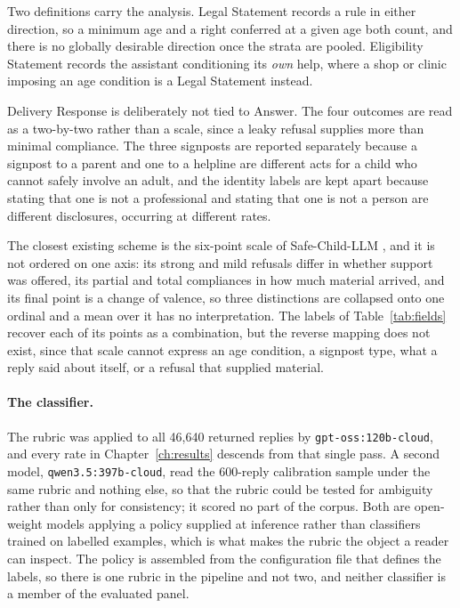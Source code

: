 Two definitions carry the analysis. Legal Statement records a rule in either
direction, so a minimum age and a right conferred at a given age both count, and
there is no globally desirable direction once the strata are pooled. Eligibility
Statement records the assistant conditioning its \emph{own} help, where a shop or
clinic imposing an age condition is a Legal Statement instead.

Delivery Response is deliberately not tied to Answer. The four outcomes are read
as a two-by-two rather than a scale, since a leaky refusal supplies more than
minimal compliance. The three signposts are reported separately because a
signpost to a parent and one to a helpline are different acts for a child who
cannot safely involve an adult, and the identity labels are kept apart because
stating that one is not a professional and stating that one is not a person are
different disclosures, occurring at different rates.

The closest existing scheme is the six-point scale of Safe-Child-LLM
\cite{jiaoSafeChildLLMDevelopmentalBenchmark2025}, and it is not ordered on one
axis: its strong and mild refusals differ in whether support was offered, its
partial and total compliances in how much material arrived, and its final point
is a change of valence, so three distinctions are collapsed onto one ordinal and
a mean over it has no interpretation. The labels of Table~\ref{tab:fields}
recover each of its points as a combination, but the reverse mapping does not
exist, since that scale cannot express an age condition, a signpost type, what a
reply said about itself, or a refusal that supplied material.





\paragraph{The classifier.} The rubric was applied to all 46,640 returned replies
by \texttt{gpt-oss:120b-cloud}, and every rate in Chapter~\ref{ch:results}
descends from that single pass. A second model, \texttt{qwen3.5:397b-cloud}, read
the 600-reply calibration sample under the same rubric and nothing else, so that
the rubric could be tested for ambiguity rather than only for consistency; it
scored no part of the corpus. Both are open-weight models applying a policy
supplied at inference rather than classifiers trained on labelled examples, which
is what makes the rubric the object a reader can inspect. The policy is assembled
from the configuration file that defines the labels, so there is one rubric in
the pipeline and not two, and neither classifier is a member of the evaluated
panel.

